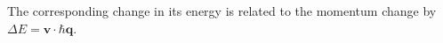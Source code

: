 The corresponding change in its energy is related to the momentum change by $\Delta E=\mathbf v\cdot\hbar\mathbf q$.
